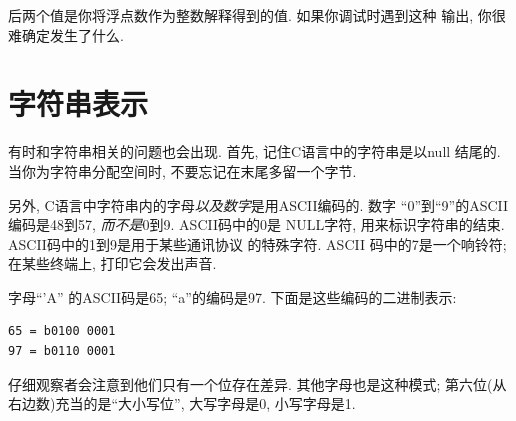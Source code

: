 \documentclass[12pt]{book}
\begin{document}
{%
后两个值是你将浮点数作为整数解释得到的值. 如果你调试时遇到这种
输出, 你很难确定发生了什么.


\section{字符串表示}

有时和字符串相关的问题也会出现. 首先, 记住C语言中的字符串是以null
结尾的. 当你为字符串分配空间时, 不要忘记在末尾多留一个字节.

另外, C语言中字符串内的字母{\it 以及数字}是用ASCII编码的. 
数字 ``0''到``9''的ASCII 编码是48到57, {\it 而不是}0到9. ASCII码中的0是
NULL字符, 用来标识字符串的结束. ASCII码中的1到9是用于某些通讯协议
的特殊字符. ASCII 码中的7是一个响铃符; 在某些终端上, 打印它会发出声音. 

字母``'A'' 的ASCII码是65; ``a''的编码是97. 下面是这些编码的二进制表示:

\begin{verbatim}
65 = b0100 0001
97 = b0110 0001
\end{verbatim}

仔细观察者会注意到他们只有一个位存在差异. 其他字母也是这种模式;
第六位(从右边数)充当的是``大小写位'', 大写字母是0, 小写字母是1. 

}
\end{document}
